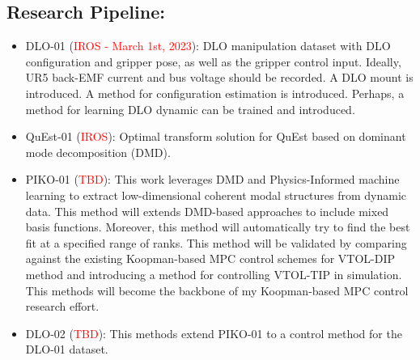 \documentclass[11pt]{article}
\begin{document}
\subsection{Research Pipeline:}
\begin{itemize}
  \item DLO-01 (\textcolor{red}{IROS - March 1st, 2023}):
  DLO manipulation dataset with DLO configuration and gripper pose, as well
  as the gripper control input. Ideally, UR5 back-EMF current and bus voltage
  should be recorded. A DLO mount is introduced. A method for configuration
  estimation is introduced. Perhaps, a method for learning DLO dynamic can be
  trained and introduced.\
  \item QuEst-01 (\textcolor{red}{IROS}):
  Optimal transform solution for QuEst based on dominant mode decomposition (DMD).
  \item PIKO-01 (\textcolor{red}{TBD}):
  This work leverages DMD and Physics-Informed machine learning to extract
  low-dimensional coherent modal structures from dynamic data. This method
  will extends DMD-based approaches to include mixed basis functions. Moreover,
  this method will automatically try to find the best fit at a specified range
  of ranks. This method will be validated by comparing against the existing
  Koopman-based MPC control schemes for VTOL-DIP method and introducing a method
  for controlling VTOL-TIP in simulation.
  This methods will become the backbone of my Koopman-based MPC
  control research effort.\
  \item DLO-02 (\textcolor{red}{TBD}):
  This methods extend PIKO-01 to a control method for the DLO-01 dataset.

\end{itemize}
  \newpage

\newpage


\end{document}
